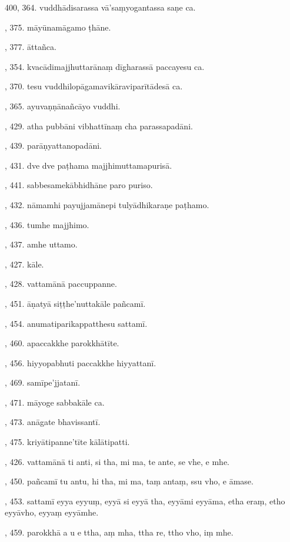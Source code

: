 400, 364. vuddhādisarassa vā’saṃyogantassa saṇe ca.\par {}, 375. māyūnamāgamo ṭhāne.\par {}, 377. āttañca.\par {}, 354. kvacādimajjhuttarānaṃ dīgharassā paccayesu ca.\par {}, 370. tesu vuddhilopāgamavikāraviparītādesā ca.\par {}, 365. ayuvaṇṇānañcāyo vuddhi.\par {}, 429. atha pubbāni vibhattīnaṃ cha parassapadāni.\par {}, 439. parāṇyattanopadāni.\par {}, 431. dve dve paṭhama majjhimuttamapurisā.\par {}, 441. sabbesamekābhidhāne paro puriso.\par {}, 432. nāmamhi payujjamānepi tulyādhikaraṇe paṭhamo.\par {}, 436. tumhe majjhimo.\par {}, 437. amhe uttamo.\par {}, 427. kāle.\par {}, 428. vattamānā paccuppanne.\par {}, 451. āṇatyā siṭṭhe’nuttakāle pañcamī.\par {}, 454. anumatiparikappatthesu sattamī.\par {}, 460. apaccakkhe parokkhātīte.\par {}, 456. hiyyopabhuti paccakkhe hiyyattanī.\par {}, 469. samīpe’jjatanī.\par {}, 471. māyoge sabbakāle ca.\par {}, 473. anāgate bhavissantī.\par {}, 475. kriyātipanne’tīte kālātipatti.\par {}, 426. vattamānā ti anti, si tha, mi ma, te ante, se vhe, e mhe.\par {}, 450. pañcamī tu antu, hi tha, mi ma, taṃ antaṃ, ssu vho, e āmase.\par {}, 453. sattamī eyya eyyuṃ, eyyā si eyyā tha, eyyāmi eyyāma, etha eraṃ, etho eyyāvho, eyyaṃ eyyāmhe.\par {}, 459. parokkhā a u e ttha, aṃ mha, ttha re, ttho vho, iṃ mhe.\par \noindent
